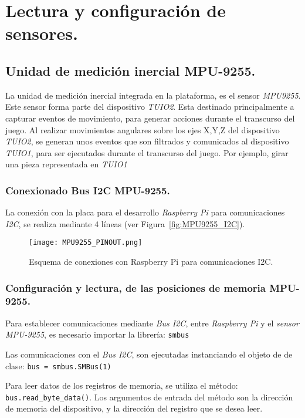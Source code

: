 \section{Lectura y configuración de sensores.}


\subsection{Unidad de medición inercial MPU-9255.}
La unidad de medición inercial integrada en la plataforma, es el sensor \emph{MPU9255}. Este sensor forma parte del dispositivo \emph{TUIO2}. Esta destinado principalmente a capturar eventos de movimiento, para generar acciones durante el transcurso del juego. Al realizar movimientos angulares sobre los ejes X,Y,Z del dispositivo \emph{TUIO2}, se generan unos eventos que son filtrados y comunicados al dispositivo \emph{TUIO1}, para ser ejecutados durante el transcurso del juego. Por ejemplo, girar una pieza representada en \emph{TUIO1}

\subsubsection{Conexionado Bus I2C MPU-9255.}


La conexión con la placa para el desarrollo \emph{Raspberry Pi} para comunicaciones \emph{I2C}, se realiza mediante 4 líneas (ver Figura~\ref{fig:MPU9255_I2C}).

\begin{figure}[!h]
\begin{center}
\texttt{[image: MPU9255\_PINOUT.png]}
\caption{Esquema de conexiones con Raspberry Pi para comunicaciones I2C.}
\label{fig:MPU9255_PINOUT}
\end{center}
\end{figure}


\subsubsection{Configuración y lectura, de las posiciones de memoria MPU-9255.}

Para establecer comunicaciones mediante \emph{Bus I2C}, entre \emph{Raspberry Pi} y el \emph{sensor MPU-9255}, es necesario importar la librería: \texttt{smbus}

Las comunicaciones con el \emph{Bus I2C}, son ejecutadas instanciando el objeto de de clase: \texttt{bus = smbus.SMBus(1)}

Para leer datos de los registros de memoria, se utiliza el método: \texttt{bus.read\_byte\_data()}. Los argumentos de entrada del método son la dirección de memoria del dispositivo, y la dirección del registro que se desea leer.


